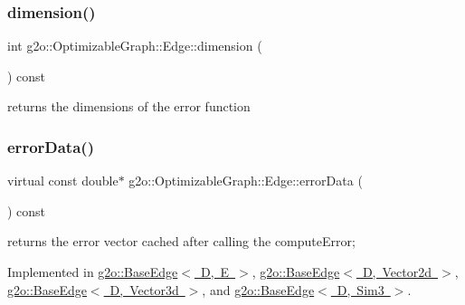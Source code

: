 \mbox{\label{classg2o_1_1_optimizable_graph_1_1_edge_a0eb19697e201bd195c45ca78d55fd041}} 
\subsubsection{\texorpdfstring{dimension()}{dimension()}}
{\footnotesize\ttfamily int g2o\+::\+Optimizable\+Graph\+::\+Edge\+::dimension (\begin{DoxyParamCaption}{ }\end{DoxyParamCaption}) const\hspace{0.3cm}{\ttfamily [inline]}}



returns the dimensions of the error function 

\mbox{\label{classg2o_1_1_optimizable_graph_1_1_edge_a5f2a4b6efa2d0ae600f94a28a6ba58cf}} 
\subsubsection{\texorpdfstring{error\+Data()}{errorData()}\hspace{0.1cm}{\footnotesize\ttfamily [1/2]}}
{\footnotesize\ttfamily virtual const double$\ast$ g2o\+::\+Optimizable\+Graph\+::\+Edge\+::error\+Data (\begin{DoxyParamCaption}{ }\end{DoxyParamCaption}) const\hspace{0.3cm}{\ttfamily [pure virtual]}}



returns the error vector cached after calling the compute\+Error; 



Implemented in \mbox{\hyperlink{classg2o_1_1_base_edge_ad99fce6bad0207979b6211ac0d589015}{g2o\+::\+Base\+Edge$<$ D, E $>$}}, \mbox{\hyperlink{classg2o_1_1_base_edge_ad99fce6bad0207979b6211ac0d589015}{g2o\+::\+Base\+Edge$<$ D, Vector2d $>$}}, \mbox{\hyperlink{classg2o_1_1_base_edge_ad99fce6bad0207979b6211ac0d589015}{g2o\+::\+Base\+Edge$<$ D, Vector3d $>$}}, and \mbox{\hyperlink{classg2o_1_1_base_edge_ad99fce6bad0207979b6211ac0d589015}{g2o\+::\+Base\+Edge$<$ D, Sim3 $>$}}.

